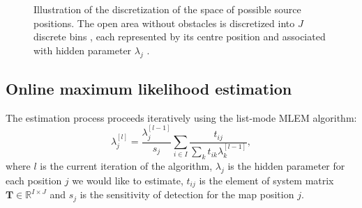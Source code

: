 \begin{figure}[!h]
  \centering

  \caption{Illustration of the discretization of the space of possible source positions. The open area without obstacles \protect{} is discretized into $J$ discrete bins \protect{}, each represented by its centre position and associated with hidden parameter $\lambda_{j}$ \protect{}.}
  \label{fig:discretization}
\end{figure}%

\subsection{Online maximum likelihood estimation}%
The estimation process proceeds iteratively using the list-mode \ac{MLEM} algorithm:
\begin{equation}
  \lambda_{j}^{[l]} = \frac{\lambda_{j}^{[l-1]}}{s_{j}} \sum_{i \in I} \frac{t_{ij}}{\sum_{k} t_{ik} \lambda_{k}^{[l-1]}},
  \label{eq:MLEM}
\end{equation}
where $l$ is the current iteration of the algorithm, $\lambda_{j}$ is the hidden parameter for each position $j$ we would like to estimate, $t_{ij}$ is the element of system matrix $\mathbf{T}\in \mathbb{R}^{I \times J}$ and $s_{j}$ is the sensitivity of detection for the map position $j$.


